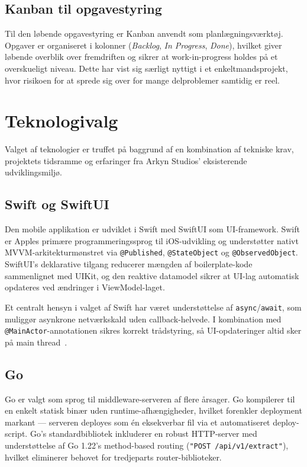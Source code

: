 \subsection{Kanban til opgavestyring}

Til den løbende opgavestyring er Kanban anvendt som planlægningsværktøj. Opgaver er organiseret i kolonner (\textit{Backlog}, \textit{In Progress}, \textit{Done}), hvilket giver løbende overblik over fremdriften og sikrer at work-in-progress holdes på et overskueligt niveau. Dette har vist sig særligt nyttigt i et enkeltmandsprojekt, hvor risikoen for at sprede sig over for mange delproblemer samtidig er reel.

\section{Teknologivalg}
\label{sec:teknologivalg}

Valget af teknologier er truffet på baggrund af en kombination af tekniske krav, projektets tidsramme og erfaringer fra Arkyn Studios' eksisterende udviklingsmiljø.

\subsection{Swift og SwiftUI}
\label{subsec:swift}

Den mobile applikation er udviklet i Swift med SwiftUI som UI-framework. Swift er Apples primære programmeringssprog til iOS-udvikling og understøtter nativt MVVM-arkitekturmønstret via \texttt{@Published}, \texttt{@StateObject} og \texttt{@ObservedObject}. SwiftUI's deklarative tilgang reducerer mængden af boilerplate-kode sammenlignet med UIKit, og den reaktive datamodel sikrer at UI-lag automatisk opdateres ved ændringer i ViewModel-laget.

Et centralt hensyn i valget af Swift har været understøttelse af \texttt{async}/\texttt{await}, som muliggør asynkrone netværkskald uden callback-helvede. I kombination med \texttt{@MainActor}-annotationen sikres korrekt trådstyring, så UI-opdateringer altid sker på main thread~\cite{swift_docs}.

\subsection{Go}
\label{subsec:go}

Go er valgt som sprog til middleware-serveren af flere årsager. Go kompilerer til en enkelt statisk binær uden runtime-afhængigheder, hvilket forenkler deployment markant — serveren deployes som én eksekverbar fil via et automatiseret deploy-script. Go's standardbibliotek inkluderer en robust HTTP-server med understøttelse af Go 1.22's method-based routing (\texttt{"POST /api/v1/extract"}), hvilket eliminerer behovet for tredjeparts router-biblioteker.

